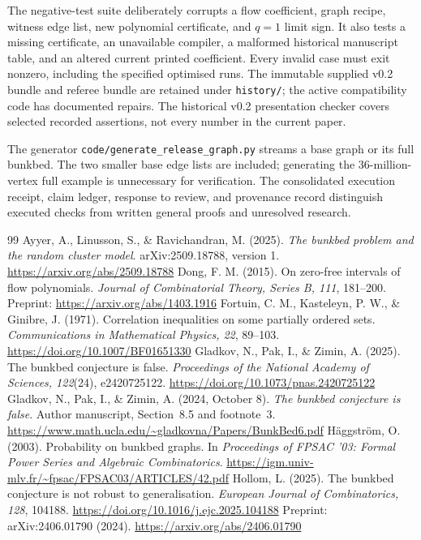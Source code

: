 \documentclass[11pt,a4paper]{article}
\theoremstyle{remark}\newtheorem{remark}[theorem]{Remark}
\begin{document}
The negative-test suite deliberately corrupts a flow coefficient, graph recipe, witness edge list, new polynomial certificate, and $q=1$ limit sign. It also tests a missing certificate, an unavailable compiler, a malformed historical manuscript table, and an altered current printed coefficient. Every invalid case must exit nonzero, including the specified optimised runs. The immutable supplied v0.2 bundle and referee bundle are retained under \texttt{history/}; the active compatibility code has documented repairs. The historical v0.2 presentation checker covers selected recorded assertions, not every number in the current paper.

The generator \texttt{code/generate\_release\_graph.py} streams a base graph or its full bunkbed. The two smaller base edge lists are included; generating the 36-million-vertex full example is unnecessary for verification. The consolidated execution receipt, claim ledger, response to review, and provenance record distinguish executed checks from written general proofs and unresolved research.

\clearpage
\begin{thebibliography}{99}
 Ayyer, A., Linusson, S., \& Ravichandran, M. (2025).
\emph{The bunkbed problem and the random cluster model}. arXiv:2509.18788, version 1.
\url{https://arxiv.org/abs/2509.18788}
 Dong, F. M. (2015). On zero-free intervals of flow polynomials.
\emph{Journal of Combinatorial Theory, Series B, 111}, 181--200.
Preprint: \url{https://arxiv.org/abs/1403.1916}
 Fortuin, C. M., Kasteleyn, P. W., \& Ginibre, J. (1971).
Correlation inequalities on some partially ordered sets.
\emph{Communications in Mathematical Physics, 22}, 89--103.
\url{https://doi.org/10.1007/BF01651330}
 Gladkov, N., Pak, I., \& Zimin, A. (2025).
The bunkbed conjecture is false.
\emph{Proceedings of the National Academy of Sciences, 122}(24), e2420725122.
\url{https://doi.org/10.1073/pnas.2420725122}
 Gladkov, N., Pak, I., \& Zimin, A. (2024, October 8).
\emph{The bunkbed conjecture is false}. Author manuscript, Section~8.5 and footnote~3.
\url{https://www.math.ucla.edu/~gladkovna/Papers/BunkBed6.pdf}
 H\"aggstr\"om, O. (2003).
Probability on bunkbed graphs. In \emph{Proceedings of FPSAC '03: Formal Power Series and Algebraic Combinatorics}.
\url{https://igm.univ-mlv.fr/~fpsac/FPSAC03/ARTICLES/42.pdf}
 Hollom, L. (2025).
The bunkbed conjecture is not robust to generalisation.
\emph{European Journal of Combinatorics, 128}, 104188.
\url{https://doi.org/10.1016/j.ejc.2025.104188}
Preprint: arXiv:2406.01790 (2024).
\url{https://arxiv.org/abs/2406.01790}
\end{thebibliography}
\end{document}
